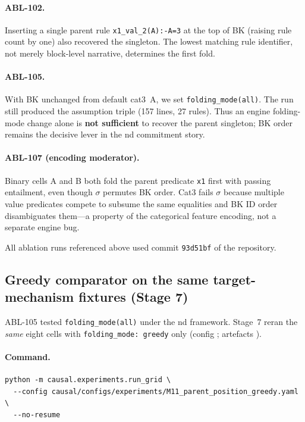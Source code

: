 \documentclass[11pt,a4paper]{article}
\begin{document}
\paragraph{ABL-102.} Inserting a single parent rule \texttt{x1\_val\_2(A):-A=3} at the top of BK
(raising rule count by one) also recovered the singleton. The lowest matching rule identifier,
not merely block-level narrative, determines the first fold.

\paragraph{ABL-105.} With BK unchanged from default cat3~A, we set \texttt{folding\_mode(all)}.
The run still produced the assumption triple (157 lines, 27 rules). Thus an engine folding-mode
change alone is \textbf{not sufficient} to recover the parent singleton; BK order remains the
decisive lever in the nd commitment story.

\paragraph{ABL-107 (encoding moderator).} Binary cells A and B both fold the parent predicate
\texttt{x1} first with passing entailment, even though $\sigma$ permutes BK order. Cat3 fails
$\sigma$ because multiple value predicates compete to subsume the same equalities and BK ID
order disambiguates them---a property of the categorical feature encoding, not a separate
engine bug.

All ablation runs referenced above used commit \texttt{93d51bf} of the repository.

\subsection{Greedy comparator on the same target-mechanism fixtures (Stage 7)}
\label{sec:greedy}

ABL-105 tested \texttt{folding\_mode(all)} under the nd framework. Stage~7 reran the
\emph{same} eight cells with \texttt{folding\_mode: greedy} only
(config ; artefacts
).

\paragraph{Command.}
\begin{verbatim}
python -m causal.experiments.run_grid \
  --config causal/configs/experiments/M11_parent_position_greedy.yaml \
  --no-resume
\end{verbatim}
\end{document}
